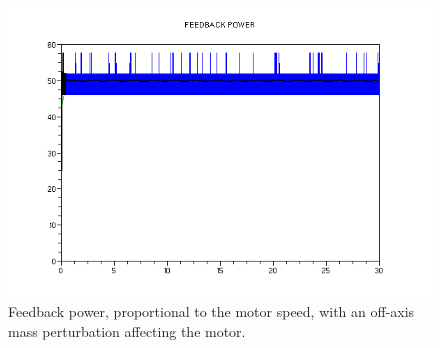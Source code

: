 \begin{figure}[H]
  \begin{center}
  \includegraphics[scale=0.5]{FIGURES_2/BRK-Weight-FP.png}
    \caption[]{Feedback power, proportional to the motor speed, with an off-axis mass perturbation affecting the motor.}
    \label{fig:weightFeedbackPower}
  \end{center}
\end{figure}